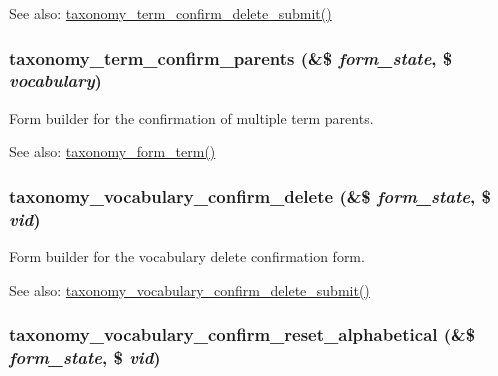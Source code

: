 \begin{Desc}
\item[See also:]\hyperlink{taxonomy_8admin_8inc_b96dee24a79d706b4b28d26ceac5e946}{taxonomy\_\-term\_\-confirm\_\-delete\_\-submit()} \end{Desc}
\hypertarget{group__forms_gc82e5e08d7d2fb7ce069411512dbc524}{
\subsubsection[{taxonomy\_\-term\_\-confirm\_\-parents}]{\setlength{\rightskip}{0pt plus 5cm}taxonomy\_\-term\_\-confirm\_\-parents (\&\$ {\em form\_\-state}, \/  \$ {\em vocabulary})}}
\label{group__forms_gc82e5e08d7d2fb7ce069411512dbc524}


Form builder for the confirmation of multiple term parents.

\begin{Desc}
\item[See also:]\hyperlink{group__forms_gc57918eae4868ce5e1c8d62c995ae295}{taxonomy\_\-form\_\-term()} \end{Desc}
\hypertarget{group__forms_gc5c29e41ed1c0a05b4678e69aff1d947}{
\subsubsection[{taxonomy\_\-vocabulary\_\-confirm\_\-delete}]{\setlength{\rightskip}{0pt plus 5cm}taxonomy\_\-vocabulary\_\-confirm\_\-delete (\&\$ {\em form\_\-state}, \/  \$ {\em vid})}}
\label{group__forms_gc5c29e41ed1c0a05b4678e69aff1d947}


Form builder for the vocabulary delete confirmation form.

\begin{Desc}
\item[See also:]\hyperlink{taxonomy_8admin_8inc_37c587803cac8e509913d1374e897040}{taxonomy\_\-vocabulary\_\-confirm\_\-delete\_\-submit()} \end{Desc}
\hypertarget{group__forms_g439f9d499952ff3647ffe0c660d0bd65}{
\subsubsection[{taxonomy\_\-vocabulary\_\-confirm\_\-reset\_\-alphabetical}]{\setlength{\rightskip}{0pt plus 5cm}taxonomy\_\-vocabulary\_\-confirm\_\-reset\_\-alphabetical (\&\$ {\em form\_\-state}, \/  \$ {\em vid})}}
\label{group__forms_g439f9d499952ff3647ffe0c660d0bd65}


